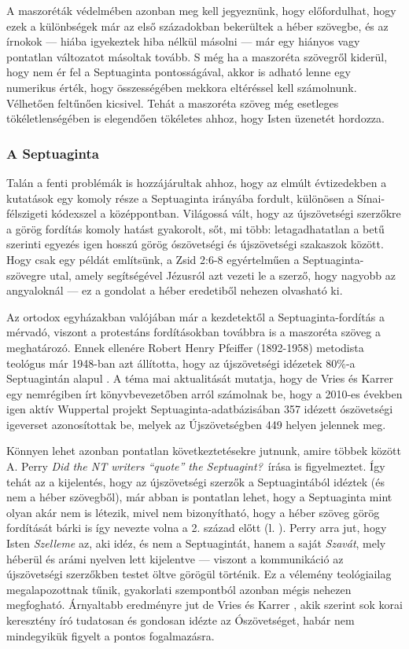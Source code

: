 \documentclass{article}
\newcommand\hu{\selectlanguage{magyar}\frenchspacing}
\newcommand\en{\selectlanguage{english}\frenchspacing}
\begin{document}
A maszoréták védelmében azonban meg kell jegyeznünk, hogy előfordulhat,
hogy ezek a különbségek már az első századokban bekerültek a héber szövegbe, és
az írnokok --- hiába igyekeztek hiba nélkül másolni --- már egy hiányos vagy pontatlan
változatot másoltak tovább. S még ha a maszoréta szövegről kiderül, hogy nem ér fel
a Septuaginta pontosságával, akkor is adható lenne egy numerikus érték, hogy összességében mekkora
eltéréssel kell számolnunk. Vélhetően feltűnően kicsivel. Tehát a maszoréta szöveg
még esetleges tökéletlenségében is elegendően tökéletes ahhoz, hogy Isten üzenetét hordozza.

\subsubsection{A Septuaginta}

Talán a fenti problémák is hozzájárultak ahhoz, hogy
az elmúlt évtizedekben a kutatások egy komoly része a Septuaginta irányába fordult,
különösen a Sínai-félszigeti kódexszel a középpontban. Világossá vált, hogy
az újszövetségi szerzőkre a görög fordítás komoly hatást gyakorolt, sőt, mi több:
letagadhatatlan a betű szerinti egyezés igen hosszú görög ószövetségi és
újszövetségi szakaszok között. Hogy csak egy példát említsünk, a Zsid 2:6-8
egyértelműen a Septuaginta-szövegre utal, amely segítségével Jézusról azt vezeti le
a szerző, hogy nagyobb az angyaloknál --- ez a gondolat a héber eredetiből nehezen olvasható ki.

Az ortodox egyházakban valójában már a kezdetektől a Septuaginta-fordítás a mérvadó,
viszont a protestáns fordításokban továbbra is a maszoréta szöveg a meghatározó.
Ennek ellenére Robert Henry Pfeiffer (1892-1958) metodista teológus már 1948-ban azt állította, hogy
az újszövetségi idézetek 80\%-a Septuagintán alapul \cite{Pfeiffer}. A téma mai aktualitását
mutatja, hogy
de Vries és Karrer egy nemrégiben írt könyvbevezetőben \cite[3. o.]{deVriesKarrer} arról számolnak be,
hogy a 2010-es években igen aktív Wuppertal projekt Septuaginta-adatbázisában 357 idézett ószövetségi igeverset
azonosítottak be,
melyek az Újszövetségben 449 helyen jelennek meg.

Könnyen lehet azonban pontatlan következtetésekre
jutnunk, amire többek között A. Perry \en\textit{Did the NT writers ``quote''
the Septuagint?}\hu\ írása \cite{Perry} is figyelmeztet. Így tehát az a kijelentés, hogy
az újszövetségi szerzők a Septuagintából idéztek (és nem a héber szövegből), már
abban is pontatlan lehet, hogy a Septuaginta mint olyan akár nem is létezik, mivel nem bizonyítható,
hogy a héber szöveg görög fordítását bárki is így nevezte volna a 2. század előtt (l.
\cite[32., 89. o.]{JobesSilva}). Perry arra jut, hogy Isten \textit{Szelleme} az, aki idéz, és nem a Septuagintát,
hanem a saját \textit{Szavát}, mely héberül és arámi nyelven lett kijelentve --- viszont a kommunikáció az újszövetségi szerzőkben
testet öltve görögül történik. Ez a vélemény teológiailag megalapozottnak tűnik,
gyakorlati szempontból azonban mégis nehezen megfogható. Árnyaltabb eredményre jut de Vries és Karrer \cite[16. o.]{deVriesKarrer},
akik szerint sok korai keresztény író tudatosan és gondosan idézte az Ószövetséget, habár nem mindegyikük
figyelt a pontos fogalmazásra.
\end{document}
